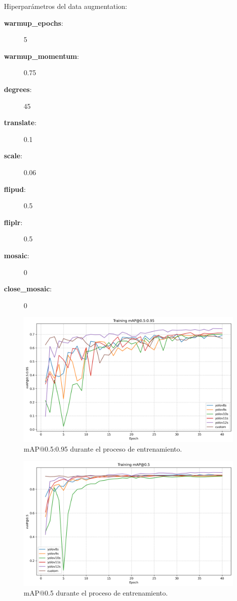 \documentclass[12pt,a4paper,onecolumn,oneside]{report}
\begin{document}
Hiperparámetros del data augmentation:

\begin{description}
  \item[\textbf{warmup\_epochs}:] 5
  \item[\textbf{warmup\_momentum}:] 0.75
  \item[\textbf{degrees}:] 45
  \item[\textbf{translate}:] 0.1
  \item[\textbf{scale}:] 0.06
  \item[\textbf{flipud}:] 0.5
  \item[\textbf{fliplr}:] 0.5
  \item[\textbf{mosaic}:] 0
  \item[\textbf{close\_mosaic}:] 0
\end{description}


\begin{figure}[htbp]
  \centering
  \includegraphics[width=1.0\textwidth]{figuras/yolo_plots/map50-95.png}
  \caption{mAP@0.5:0.95 durante el proceso de entrenamiento.}
  \label{fig:yolo_train_map95}
\end{figure}

\begin{figure}[htbp]
  \centering
  \includegraphics[width=1.0\textwidth]{figuras/yolo_plots/map50.png}
  \caption{mAP@0.5 durante el proceso de entrenamiento.}
  \label{fig:yolo_train_map50}
\end{figure}
\end{document}
